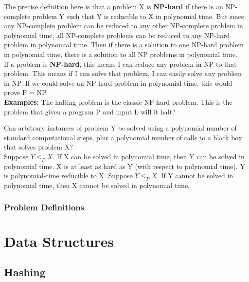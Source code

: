 \documentclass[a4paper,oneside]{book}
\begin{document}
\begin{definition}[NP Hard]
The precise definition here is that a problem X is \textbf{NP-hard} if there is an NP-complete problem Y such that Y is reducible to X in polynomial time. But since any NP-complete problem can be reduced to any other NP-complete problem in polynomial time, all NP-complete problems can be reduced to any NP-hard problem in polynomial time. Then if there is a solution to one NP-hard problem in polynomial time, there is a solution to all NP problems in polynomial time.\\
If a problem is \textbf{NP-hard}, this means I can reduce any problem in NP to that problem.  This means if I can solve that problem, I can easily solve any problem in NP.  If we could solve an NP-hard problem in polynomial time, this would prove P = NP.\\
\textbf{Examples:} The halting problem is the classic NP-hard problem. This is the problem that given a program P and input I, will it halt? 
\end{definition}
\begin{definition}
 Can arbitrary instances of problem Y be solved using a polynomial number of standard computational steps, plus a polynomial number of calls to a black box that solves problem X? \\
Suppose $Y \le_P X$. If X can be solved in polynomial time, then Y can be solved in polynomial time. X is at least as hard as Y (with respect to polynomial time). Y is polynomial-time reducible to X. Suppose $Y \le_P X$. If Y cannot be solved in polynomial time, then X cannot be solved in polynomial time.
\end{definition}
\section{Problem Definitions}
\begin{definition}

\end{definition}
\begin{definition}[]

\end{definition}




\part{Data Structures}
\chapter{Hashing}
\end{document}
